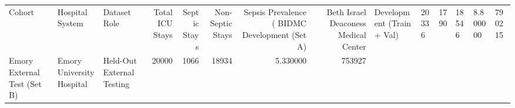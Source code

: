 \begin{tabular}{lllrrrrr}
\toprule
Cohort & Hospital System & Dataset Role & Total ICU Stays & Septic Stays & Non-Septic Stays & Sepsis Prevalence (%
\midrule
BIDMC Development (Set A) & Beth Israel Deaconess Medical Center & Development (Train + Val) & 20336 & 1790 & 18546 & 8.800000 & 790215 \\
Emory External Test (Set B) & Emory University Hospital & Held-Out External Testing & 20000 & 1066 & 18934 & 5.330000 & 753927 \\
\bottomrule
\end{tabular}
